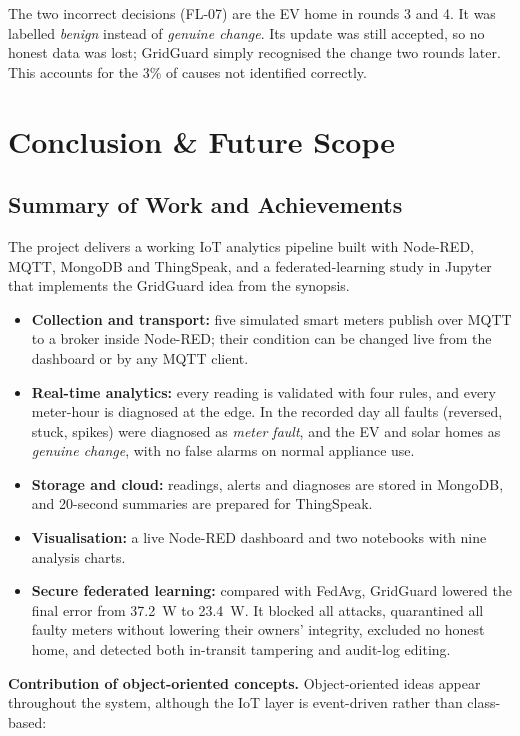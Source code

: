 \documentclass[12pt,a4paper,oneside]{report}
\begin{document}
The two incorrect decisions (FL-07) are the EV home in rounds 3 and 4. It was labelled \emph{benign} instead of \emph{genuine change}. Its update was still accepted, so no honest data was lost; GridGuard simply recognised the change two rounds later. This accounts for the 3\% of causes not identified correctly.

\chapter{Conclusion \& Future Scope}

\section{Summary of Work and Achievements}

The project delivers a working IoT analytics pipeline built with Node-RED, MQTT, MongoDB and ThingSpeak, and a federated-learning study in Jupyter that implements the GridGuard idea from the synopsis.

\begin{itemize}
\item \textbf{Collection and transport:} five simulated smart meters publish over MQTT to a broker inside Node-RED; their condition can be changed live from the dashboard or by any MQTT client.
\item \textbf{Real-time analytics:} every reading is validated with four rules, and every meter-hour is diagnosed at the edge. In the recorded day all faults (reversed, stuck, spikes) were diagnosed as \emph{meter fault}, and the EV and solar homes as \emph{genuine change}, with no false alarms on normal appliance use.
\item \textbf{Storage and cloud:} readings, alerts and diagnoses are stored in MongoDB, and 20-second summaries are prepared for ThingSpeak.
\item \textbf{Visualisation:} a live Node-RED dashboard and two notebooks with nine analysis charts.
\item \textbf{Secure federated learning:} compared with FedAvg, GridGuard lowered the final error from 37.2~W to 23.4~W. It blocked all attacks, quarantined all faulty meters without lowering their owners' integrity, excluded no honest home, and detected both in-transit tampering and audit-log editing.
\end{itemize}

\textbf{Contribution of object-oriented concepts.} Object-oriented ideas appear throughout the system, although the IoT layer is event-driven rather than class-based:
\end{document}
